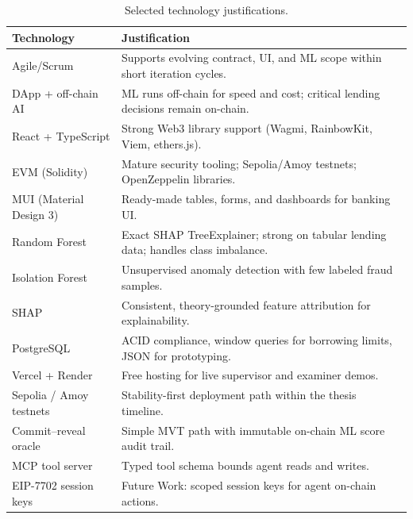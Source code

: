 \documentclass[12pt,a4paper]{report}
\newcommand{\tableheadcolor}{\rowcolor{TableHeadBg}}
\begin{document}
\begin{table}[H]
\centering
\caption[Selected technology justifications]{Selected technology justifications.}
\label{tab:tech-justification-selected}
\small
\begin{tabular}{@{}p{3.2cm}p{9.8cm}@{}}
\toprule
\tableheadcolor
\textbf{Technology} & \textbf{Justification} \\
\midrule
Agile/Scrum & Supports evolving contract, UI, and ML scope within short iteration cycles. \\
DApp + off-chain AI & ML runs off-chain for speed and cost; critical lending decisions remain on-chain. \\
React + TypeScript & Strong Web3 library support (Wagmi, RainbowKit, Viem, ethers.js). \\
EVM (Solidity) & Mature security tooling; Sepolia/Amoy testnets; OpenZeppelin libraries. \\
MUI (Material Design 3) & Ready-made tables, forms, and dashboards for banking UI. \\
Random Forest & Exact SHAP TreeExplainer; strong on tabular lending data; handles class imbalance. \\
Isolation Forest & Unsupervised anomaly detection with few labeled fraud samples. \\
SHAP & Consistent, theory-grounded feature attribution for explainability. \\
PostgreSQL & ACID compliance, window queries for borrowing limits, JSON for prototyping. \\
Vercel + Render & Free hosting for live supervisor and examiner demos. \\
Sepolia / Amoy testnets & Stability-first deployment path within the thesis timeline. \\
Commit--reveal oracle & Simple MVT path with immutable on-chain ML score audit trail. \\
MCP tool server & Typed tool schema bounds agent reads and writes. \\
EIP-7702 session keys & Future Work: scoped session keys for agent on-chain actions. \\
\bottomrule
\end{tabular}
\end{table}
\end{document}
